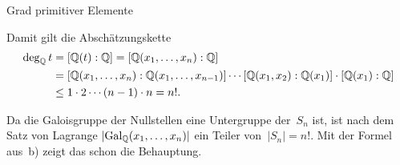 \documentclass{algblatt}
\begin{document}
\begin{aufgabe}{Grad primitiver Elemente}
\begin{loesungE}
Damit gilt die Abschätzungskette
\begin{align*}
  \deg_{\mathbb{Q}} t &= [\mathbb{Q}(t):\mathbb{Q}] = [\mathbb{Q}(x_1,\ldots,x_n):\mathbb{Q}] \\
  &= [\mathbb{Q}(x_1,\ldots,x_n):\mathbb{Q}(x_1,\ldots,x_{n-1})] \cdots
    [\mathbb{Q}(x_1,x_2):\mathbb{Q}(x_1)] \cdot [\mathbb{Q}(x_1):\mathbb{Q}] \\
  &\leq 1 \cdot 2 \cdots (n-1) \cdot n = n!.
\end{align*}

\item Da die Galoisgruppe der Nullstellen eine Untergruppe der~$S_n$ ist, ist
nach dem Satz von Lagrange $|\mathrm{Gal}_{\mathbb{Q}}(x_1,\ldots,x_n)|$ ein Teiler von~$|S_n| =
n!$. Mit der Formel aus~b) zeigt das schon die Behauptung.
\end{loesungE}
\end{aufgabe}
\end{document}

